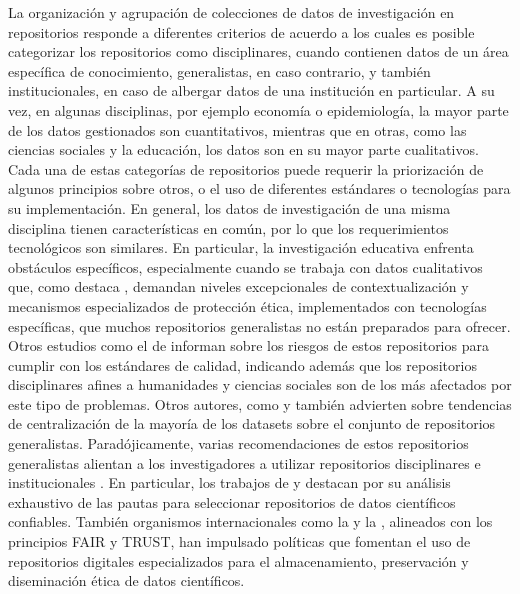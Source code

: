 \documentclass[runningheads]{llncs}
\begin{document}
La organización y agrupación de colecciones de datos de investigación en repositorios responde a diferentes criterios de acuerdo a los cuales es posible categorizar los repositorios como disciplinares, cuando contienen datos 
de un área específica de conocimiento, generalistas, en caso contrario, y también institucionales, en caso de albergar datos de una institución en particular. %
A su vez, en algunas disciplinas, por ejemplo economía o epidemiología, la mayor parte de los datos gestionados son cuantitativos, mientras que en otras, como las ciencias sociales y la educación, los datos son en su mayor parte cualitativos. Cada una de estas categorías de repositorios puede requerir la priorización de algunos principios sobre otros, o el uso de diferentes estándares o tecnologías para su implementación. En general, los datos de investigación de una misma disciplina tienen características en común, por lo que los requerimientos tecnológicos son similares. %
En particular, la investigación educativa enfrenta obstáculos específicos, especialmente cuando se trabaja con datos cualitativos que, como destaca \citep{antonio}, demandan niveles excepcionales de contextualización y mecanismos especializados de protección ética, implementados con tecnologías específicas, que muchos repositorios generalistas no están preparados para ofrecer.   
Otros estudios como el de \citep{strecker_disappearing_repos_23} informan sobre los riesgos de estos repositorios para cumplir con los estándares de calidad, indicando además que los repositorios disciplinares afines a humanidades y ciencias sociales son de los más afectados por este tipo de problemas. Otros autores, como \citep{google_dataset_aglomeration} y \citep{ Gerasimov2024} también advierten sobre tendencias de centralización de la mayoría de los datasets sobre el conjunto de repositorios generalistas. Paradójicamente, varias recomendaciones de estos repositorios generalistas alientan a los investigadores a utilizar repositorios disciplinares e institucionales \cite{barbosa_2024_11105430}.
En particular, los trabajos de \citep{Jia25} y \citep{avila2024} destacan por su análisis exhaustivo de las pautas para seleccionar repositorios de datos científicos confiables. 
También organismos internacionales como la \cite{unesco2021} y la \cite{OECD2020}, alineados con los principios FAIR y TRUST, han impulsado políticas que fomentan el uso de repositorios digitales especializados para el almacenamiento, preservación y diseminación ética de datos científicos. 
\end{document}
